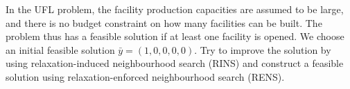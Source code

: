 \begin{itemize}
	In the UFL problem, the facility production capacities are assumed to be large, and there is no budget constraint on how many facilities can be built. The problem thus has a feasible solution if at least one facility is opened. We choose an initial feasible solution $\bar{y} = (1,0,0,0,0)$. Try to improve the solution by using relaxation-induced neighbourhood search (RINS) and construct a feasible solution using relaxation-enforced neighbourhood search (RENS). 
\end{itemize}
